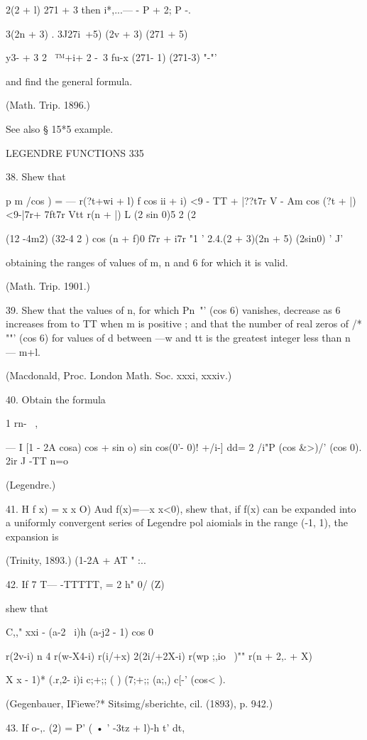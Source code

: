 {{{{2(2 + l) 271 + 3 then i*,...— - P + 2; P -.

3(2n + 3) . 3J27i\ +5) (2v + 3) (271 + 5)

y3- + 3 2 \ ™+i+ 2 -\ 3 fu-x (271- 1) (271-3) "-"'

and find the general formula.

(Math. Trip. 1896.)

See also § 15*5 example.

LEGENDRE FUNCTIONS 335

38. Shew that

p m /cos ) = — r(?t+wi + l) f cos ii + i) <9 - TT + |??t7r V - Am cos
(?t + |)<9-|7r+ 7ft7r Vtt r(n + |) L (2 sin 0)5 2 (2%

(12 -4m2) (32-4 2 ) cos (n + f)0 f7r + i7r "1 ' 2.4.(2 + 3)(2n + 5)
(2sin0) ' J'

obtaining the ranges of values of m, n and 6 for which it is valid.

(Math. Trip. 1901.)

39. Shew that the values of n, for which Pn~"' (cos 6) vanishes,
decrease as 6 increases from to TT when m is positive ; and that the
number of real zeros of /* ""' (cos 6) for values of d between —w and
tt is the greatest integer less than n — m+l.

(Macdonald, Proc. London Math. Soc. xxxi, xxxiv.)

40. Obtain the formula

1 rn- \ ,

— I [1 - 2A cosa) cos + sin o) sin cos(0'- 0)! +/i-] dd= 2 /i"P (cos
\&>)/' (cos 0). 2ir J -TT n=o

(Legendre.)

41. H f x) = x x O) Aud f(x)=—x x<0), shew that, if f(x) can be
expanded into a uniformly convergent series of Legendre pol aiomials
in the range (-1, 1), the expansion is

(Trinity, 1893.) (1-2A + AT " :..

42. If 7 T— -TTTTT, = 2 h" 0/ (Z)

shew that

C,," xxi - (a-2 \ i)h (a-j2 - 1) cos 0

  r(2v-i) n 4 r(w-X4-i) r(i/+x) 2(2i/+2X-i) r(wp ;,io ~)"" r(n + 2,. +
X)

X x - 1)* (.r,2- i)i c;+;; ( ) (7;+;; (a;,) c[-' (cos< ).

(Gegenbauer, IFiewe?* Sitsimg/sberichte, cil. (1893), p. 942.)

43. If o-,. (2) = P' ( • ' -3tz + l)-h t' dt,

}}}}
